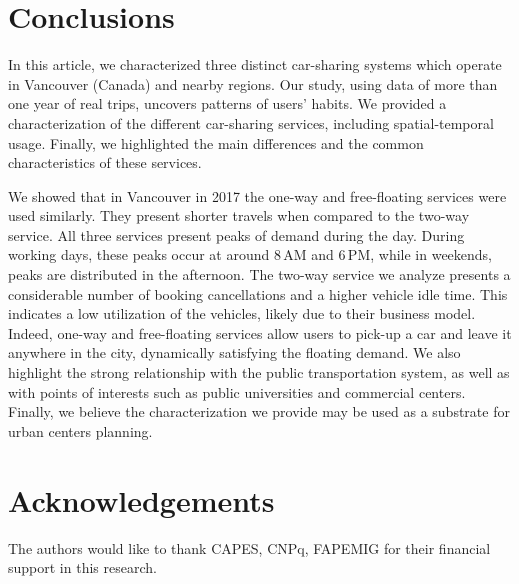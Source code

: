 \section{Conclusions} 
\label{sec:3_6_conclusion}

In this article, we characterized three distinct car-sharing systems which operate in  Vancouver  (Canada)  and nearby regions. Our study, using data of more than one year of real trips, uncovers patterns of users’ habits.  We provided a characterization of the different car-sharing services, including spatial-temporal usage. Finally, we highlighted the main differences and the common characteristics of these services.

We showed that in Vancouver in 2017 the one-way and free-floating services were used similarly. They present shorter travels when compared to the two-way service. All three services present peaks of demand during the day. During working days, these peaks occur at around 8\,AM and 6\,PM, while in weekends, peaks are distributed in the afternoon. The two-way service we analyze presents a considerable number of booking cancellations and a higher vehicle idle time. This indicates a low utilization of the vehicles, likely due to their business model. Indeed, one-way and free-floating services allow users to pick-up a car and leave it anywhere in the city, dynamically satisfying the floating demand. 
We also highlight the strong relationship with the public transportation system, as well as with points of interests such as public universities and commercial centers.  Finally, we believe the characterization we provide may be used as a substrate for urban centers planning.

\section*{Acknowledgements}

The authors would like to thank CAPES, CNPq, FAPEMIG for their financial support in this research.